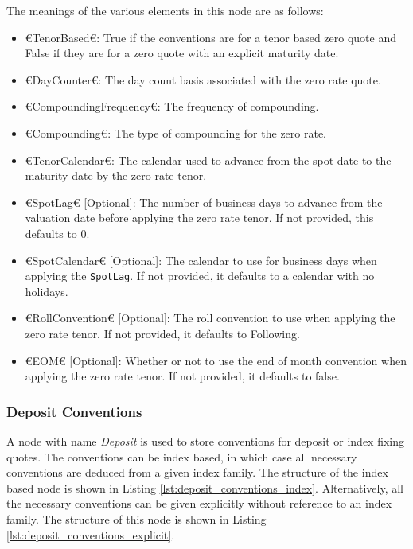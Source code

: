 The meanings of the various elements in this node are as follows:
\begin{itemize}
\item €TenorBased€: True if the conventions are for a tenor based zero quote and False if they are for a zero quote with an 
explicit maturity date.
\item €DayCounter€: The day count basis associated with the zero rate quote.
\item €CompoundingFrequency€: The frequency of compounding.
\item €Compounding€: The type of compounding for the zero rate.
\item €TenorCalendar€: The calendar used to advance from the spot date to the maturity date by the zero rate tenor.
\item €SpotLag€ [Optional]: The number of business days to advance from the valuation date before applying the zero rate 
tenor. If not provided, this defaults to 0.
\item €SpotCalendar€ [Optional]: The calendar to use for business days when applying the \lstinline!SpotLag!. If not 
provided, it defaults to a calendar with no holidays.
\item €RollConvention€ [Optional]: The roll convention to use when applying the zero rate tenor. If not provided, it 
defaults to Following.
\item €EOM€ [Optional]: Whether or not to use the end of month convention when applying the zero rate tenor. If not 
provided, it defaults to false.
\end{itemize}

\subsubsection{Deposit Conventions}

A node with name \emph{Deposit} is used to store conventions for deposit or index fixing quotes. The conventions can be 
index based, in which case all necessary conventions are deduced from a given index family. The structure of the index 
based node is shown in Listing \ref{lst:deposit_conventions_index}. Alternatively, all the necessary conventions can be 
given explicitly without reference to an index family. The structure of this node is shown in Listing 
\ref{lst:deposit_conventions_explicit}.

